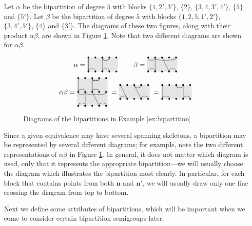 \begin{example}
  \label{ex:bipartition}
  Let $\alpha$ be the bipartition of degree $5$ with blocks $\{1, 2', 3'\}$,
  $\{2\}$, $\{3, 4, 3', 4'\}$, $\{5\}$ and $\{5'\}$.  Let $\beta$ be the
  bipartition of degree $5$ with blocks $\{1, 2, 5, 1', 2'\}$, $\{3, 4', 5'\}$,
  $\{4\}$ and $\{3'\}$.  The diagrams of these two figures, along with their
  product $\alpha \beta$, are shown in Figure \ref{fig:bipartition-example}.
  Note that two different diagrams are shown for $\alpha \beta$.
  \begin{figure}[h]
    \centering
    $$\alpha = \bipartdiag{\tv11\bc12 \tc34 \tv33\tc34\bc34} \qquad
    \beta = \bipartdiag{\tc12\tc25\tv22\bc12 \tv34\bc45}$$
    $$\alpha \beta = \doublebipartdiag{\utv11\ubc12 \utc34 \utv33\utc34\ubc34
      \tc12\tc25\tv22\bc12 \tv34\bc45}
    = \bipartdiag{\tv12\bc12 \tc34\tv34\bc45}
    = \bipartdiag{\tv11\bc12 \tc34\tv44\bc45}$$
    \caption{Diagrams of the bipartitions in Example \ref{ex:bipartition}}
    \label{fig:bipartition-example}
  \end{figure}
\end{example}

Since a given equivalence may have several spanning skeletons, a bipartition may
be represented by several different diagrams; for example, note the two
different representations of $\alpha \beta$ in Figure
\ref{fig:bipartition-example}.  In general, it does not matter which diagram is
used, only that it represents the appropriate bipartition---we will usually
choose the diagram which illustrates the bipartition most clearly.  In
particular, for each block that contains points from both $\mathbf{n}$ and
$\mathbf{n}'$, we will usually draw only one line crossing the diagram from top
to bottom.

Next we define some attributes of bipartitions, which will be important when we
come to consider certain bipartition semigroups later.

